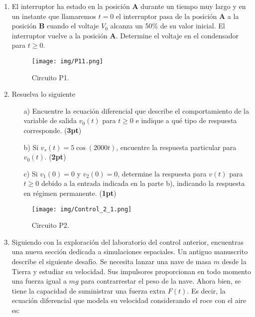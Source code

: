 \documentclass[
	spanish, %
	letterpaper, oneside
]{article}
\begin{document}
\templatePagecfg

\begin{enumerate}
    \item El interruptor ha estado en la posición \textbf{A} durante un tiempo muy largo y en un instante que llamaremos \( t=0 \) el interruptor pasa de la posición \textbf{A} a la posición \textbf{B} cuando el voltaje \( V_0 \) alcanza un 50\% de su valor inicial. El interruptor vuelve a la posición \textbf{A}. Determine el voltaje en el condensador para \( t \geq 0 \).

    \begin{figure}
        \centering
        \texttt{[image: img/P11.png]}
        \caption{Circuito P1.}
        \label{fig:p1}
    \end{figure}
    \item Resuelva lo siguiente
\begin{enumerate}
    \item[a)] Encuentre la ecuación diferencial que describe el comportamiento de la variable de salida \( v_0(t) \) para \( t \geq 0 \) e indique a qué tipo de respuesta corresponde.  (\textbf{3pt})
    
    \item[b)] Si \( v_s(t) = 5\cos(2000t) \), encuentre la respuesta particular para \( v_0(t) \).  (\textbf{2pt})
    
    \item[c)] Si \( v_1(0) = 0 \) y \( v_2(0) = 0 \), determine la respuesta para \( v(t) \) para \( t \geq 0 \) debido a la entrada indicada en la parte b), indicando la respuesta en régimen permanente.  (\textbf{1pt})
\end{enumerate}

    \begin{figure}
        \centering
        \texttt{[image: img/Control\_2\_1.png]}
        \caption{Circuito P2.}
        \label{fig:p2}
    \end{figure}
    \item Siguiendo con la exploración del laboratorio del control anterior, encuentras una nueva sección dedicada a simulaciones espaciales. Un antiguo manuscrito describe el siguiente desafío. Se necesita lanzar una nave de masa \( m \) desde la Tierra y estudiar su velocidad. Sus impulsores proporcionan en todo momento una fuerza igual a \( mg \) para contrarrestar el peso de la nave. Ahora bien, se tiene la capacidad de suministrar una fuerza extra \( F(t) \). Es decir, la ecuación diferencial que modela su velocidad considerando el roce con el aire es:


\end{enumerate}
\end{document}
